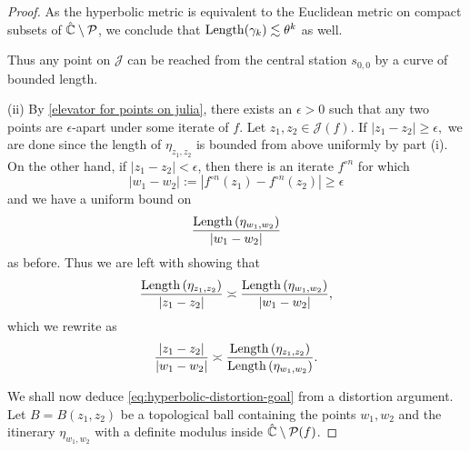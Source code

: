 \begin{proof}
As the hyperbolic metric is equivalent to the Euclidean metric on compact subsets
of $\hat{\mathbb C} \setminus \operatorname{\mathcal P}$,
we conclude that $\operatorname{Length}(\gamma_k) \lesssim \theta^k$ as well.

Thus any point on $\mathcal J$ can be reached from the central station 
$s_{0,0}$ by a curve of bounded length.

(ii) By \cref{elevator for points on julia}, 
there exists an $\epsilon>0$ such that any two points are $\epsilon$-apart 
under some iterate of $f$. 
Let $z_{1},z_{2}\in\mathcal{J}(f)$. If $\left|z_{1}-z_{2}\right|\geq\epsilon,$ 
we are done since the length of $\eta_{z_1,z_2}$ is bounded from above uniformly by part (i).
On the other hand, if 
$\left|z_{1}-z_{2}\right|<\epsilon$,
then there is an iterate $f^{\circ n}$ for which
\begin{equation}
	|w_1-w_2|:=\left|f^{\circ n}(z_{1})-f^{\circ n}(z_{2})\right|\geq\epsilon
\end{equation}
and we have a uniform bound on
$$\frac{\operatorname{Length}\left(\eta_{w_1,w_2}\right)}{|w_1-w_2|}$$ as before.
Thus we are left with showing that
\begin{equation}
	\frac{\operatorname{Length}\left(\eta_{z_{1},z_{2}}\right)}{|z_1-z_2|}\asymp\frac{\operatorname{Length}\left(\eta_{w_1,w_2}\right)}{|w_1-w_2|},
\end{equation}
which we rewrite as
\begin{equation} \label{eq:hyperbolic-distortion-goal}
	\frac{|z_1-z_2|}{|w_1-w_2|}
	\asymp
	\frac{\operatorname{Length}\left(\eta_{z_{1},z_{2}}\right)}{\operatorname{Length}\left(\eta_{w_1,w_2}\right)}.
\end{equation}

We shall now deduce \cref{eq:hyperbolic-distortion-goal} from a distortion argument.
Let $B=B(z_1,z_2)$ be a topological ball containing the points $w_1,w_2$ 
and the itinerary $\eta_{w_1,w_2}$
with a definite modulus inside $\hat{\mathbb C }\setminus \operatorname{\mathcal P}(f)$.



\end{proof}
